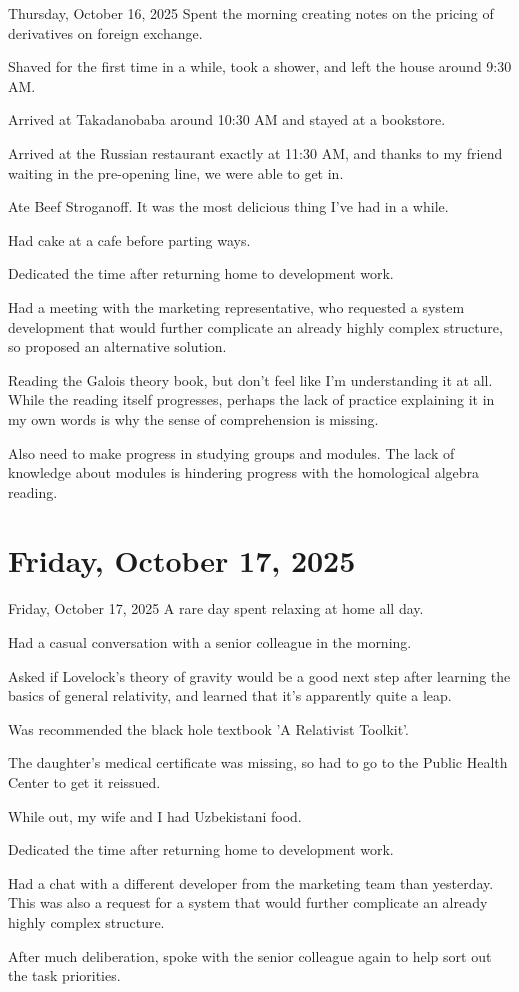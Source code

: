 \documentclass[dvipdfmx, autodetect-engine, aspectratio=169, 10.5pt]{beamer}
\begin{document}
\begin{frame}{Thursday, October 16, 2025}
	Spent the morning creating notes on the pricing of derivatives on foreign exchange.

	Shaved for the first time in a while, took a shower, and left the house around 9:30 AM.

	Arrived at Takadanobaba around 10:30 AM and stayed at a bookstore.

	Arrived at the Russian restaurant exactly at 11:30 AM, and thanks to my friend waiting in the pre-opening line, we were able to get in.

	Ate Beef Stroganoff. It was the most delicious thing I've had in a while.

	Had cake at a cafe before parting ways.

	Dedicated the time after returning home to development work.

	Had a meeting with the marketing representative, who requested a system development that would further complicate an already highly complex structure, so proposed an alternative solution.

	Reading the Galois theory book, but don't feel like I'm understanding it at all.
	While the reading itself progresses, perhaps the lack of practice explaining it in my own words is why the sense of comprehension is missing.

	Also need to make progress in studying groups and modules.
	The lack of knowledge about modules is hindering progress with the homological algebra reading.
\end{frame}

\section{Friday, October 17, 2025}

\begin{frame}{Friday, October 17, 2025}
	A rare day spent relaxing at home all day.

	Had a casual conversation with a senior colleague in the morning.

	Asked if Lovelock's theory of gravity would be a good next step after learning the basics of general relativity, and learned that it's apparently quite a leap.

	Was recommended the black hole textbook 'A Relativist Toolkit'.

	The daughter's medical certificate was missing, so had to go to the Public Health Center to get it reissued.

	While out, my wife and I had Uzbekistani food.

	Dedicated the time after returning home to development work.

	Had a chat with a different developer from the marketing team than yesterday.
	This was also a request for a system that would further complicate an already highly complex structure.

	After much deliberation, spoke with the senior colleague again to help sort out the task priorities.
\end{frame}
\end{document}
